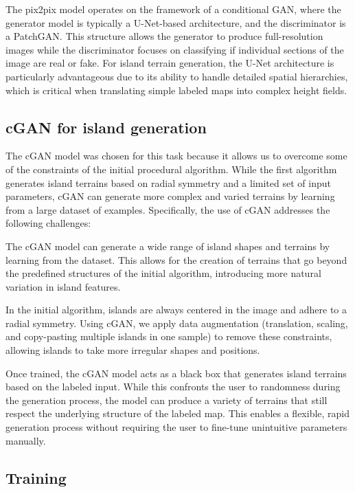 The pix2pix model operates on the framework of a conditional GAN, where the generator model is typically a U-Net-based architecture, and the discriminator is a PatchGAN. This structure allows the generator to produce full-resolution images while the discriminator focuses on classifying if individual sections of the image are real or fake. For island terrain generation, the U-Net architecture is particularly advantageous due to its ability to handle detailed spatial hierarchies, which is critical when translating simple labeled maps into complex height fields. 


\subsection{cGAN for island generation}

The cGAN model was chosen for this task because it allows us to overcome some of the constraints of the initial procedural algorithm. While the first algorithm generates island terrains based on radial symmetry and a limited set of input parameters, cGAN can generate more complex and varied terrains by learning from a large dataset of examples. Specifically, the use of cGAN addresses the following challenges:
\begin{Itemize}
     The cGAN model can generate a wide range of island shapes and terrains by learning from the dataset. This allows for the creation of terrains that go beyond the predefined structures of the initial algorithm, introducing more natural variation in island features.

     In the initial algorithm, islands are always centered in the image and adhere to a radial symmetry. Using cGAN, we apply data augmentation (translation, scaling, and copy-pasting multiple islands in one sample) to remove these constraints, allowing islands to take more irregular shapes and positions.

     Once trained, the cGAN model acts as a black box that generates island terrains based on the labeled input. While this confronts the user to randomness during the generation process, the model can produce a variety of terrains that still respect the underlying structure of the labeled map. This enables a flexible, rapid generation process without requiring the user to fine-tune unintuitive parameters manually.
\end{Itemize}


\subsection{Training}

